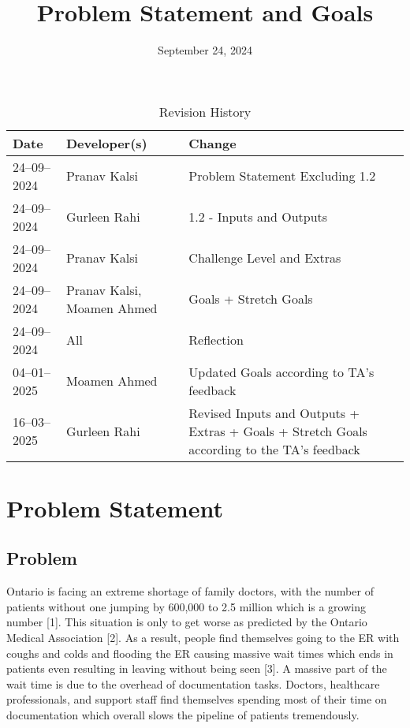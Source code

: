 \documentclass{article}
\title{Problem Statement and Goals\\\progname}
\author{\authname}
\date{September 24, 2024}
\begin{document}
\maketitle

\begin{table}[hp]
\caption{Revision History} \label{TblRevisionHistory}
\begin{tabularx}{\textwidth}{llX}
\toprule
\textbf{Date} & \textbf{Developer(s)} & \textbf{Change}\\
\midrule
24--09--2024 & Pranav Kalsi & Problem Statement Excluding 1.2\\
24--09--2024 & Gurleen Rahi & 1.2 - Inputs and Outputs\\
24--09--2024 & Pranav Kalsi & Challenge Level and Extras\\
24--09--2024 & Pranav Kalsi, Moamen Ahmed & Goals + Stretch Goals\\
24--09--2024 & All & Reflection\\
04--01--2025 & Moamen Ahmed & Updated Goals according to TA's feedback\\
16--03--2025 & Gurleen Rahi & Revised Inputs and Outputs + Extras + Goals + Stretch Goals according to the TA's feedback\\ 
\bottomrule
\end{tabularx}
\end{table}

\section{Problem Statement}

\subsection{Problem}

Ontario is facing an extreme shortage of family doctors, with the number of patients without one jumping by 600,000 to 2.5 million which is a growing number [1]. This situation is only to get worse as predicted by the Ontario Medical Association [2]. As a result, people find themselves going to the ER with coughs and colds and flooding the ER causing massive wait times which ends in patients even resulting in leaving without being seen [3]. A massive part of the wait time is due to the overhead of documentation tasks. Doctors, healthcare professionals, and support staff find themselves spending most of their time on documentation which overall slows the pipeline of patients tremendously.
\end{document}
